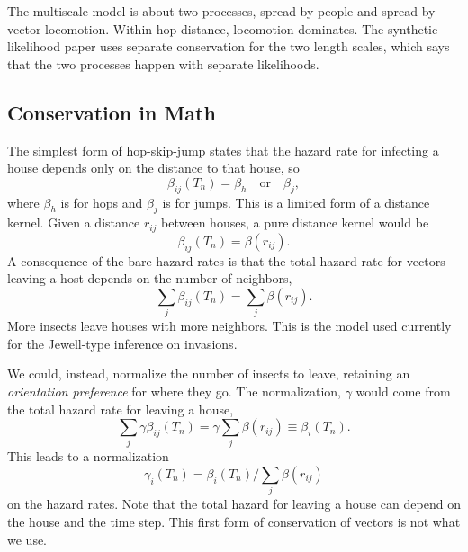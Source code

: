 \documentclass{article}
\begin{document}
The multiscale model is about two processes, spread by people and
spread by vector locomotion. Within hop distance, locomotion
dominates. The synthetic likelihood paper uses separate conservation
for the two length scales, which says that the two processes
happen with separate likelihoods.

\subsection{Conservation in Math}
The simplest form of hop-skip-jump states that the hazard rate
for infecting a house depends only on the distance to that
house, so
\begin{equation}
  \beta_{ij}(T_n)=\beta_h\quad\mbox{or}\quad \beta_j,
\end{equation}
where $\beta_h$ is for hops and $\beta_j$ is for jumps. This is a
limited form of a distance kernel. Given a distance $r_{ij}$
between houses, a pure distance kernel would be
\begin{equation}
  \beta_{ij}(T_n)=\beta(r_{ij}).
\end{equation}
A consequence of the bare hazard rates is that the total hazard
rate for vectors leaving a host depends on the number of
neighbors,
\begin{equation}
  \sum_j \beta_{ij}(T_n)=\sum_j\beta(r_{ij}).
\end{equation}
More insects leave houses with more neighbors. This is the model
used currently for the Jewell-type inference on invasions.

We could, instead, normalize the number of insects to leave,
retaining an \emph{orientation preference\/} for where they go.
The normalization, $\gamma$ would come from the total hazard rate for leaving
a house,
\begin{equation}
  \sum_j \gamma\beta_{ij}(T_n)=\gamma\sum_j\beta(r_{ij})\equiv \beta_i(T_n).
\end{equation}
This leads to a normalization
\begin{equation}
  \gamma_i(T_n)=\beta_i(T_n)/\sum_j\beta(r_{ij})
\end{equation}
on the hazard rates. Note that the total hazard for leaving a house
can depend on the house and the time step.
This first form of conservation of vectors is not what we use.
\end{document}
